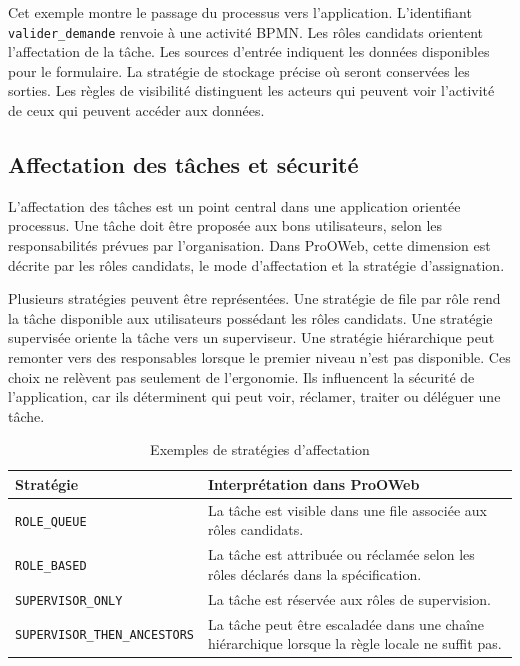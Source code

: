 Cet exemple montre le passage du processus vers l'application. L'identifiant \texttt{valider\_demande} renvoie à une activité BPMN. Les rôles candidats orientent l'affectation de la tâche. Les sources d'entrée indiquent les données disponibles pour le formulaire. La stratégie de stockage précise où seront conservées les sorties. Les règles de visibilité distinguent les acteurs qui peuvent voir l'activité de ceux qui peuvent accéder aux données.

\subsection{Affectation des tâches et sécurité}

L'affectation des tâches est un point central dans une application orientée processus. Une tâche doit être proposée aux bons utilisateurs, selon les responsabilités prévues par l'organisation. Dans ProOWeb, cette dimension est décrite par les rôles candidats, le mode d'affectation et la stratégie d'assignation.

Plusieurs stratégies peuvent être représentées. Une stratégie de file par rôle rend la tâche disponible aux utilisateurs possédant les rôles candidats. Une stratégie supervisée oriente la tâche vers un superviseur. Une stratégie hiérarchique peut remonter vers des responsables lorsque le premier niveau n'est pas disponible. Ces choix ne relèvent pas seulement de l'ergonomie. Ils influencent la sécurité de l'application, car ils déterminent qui peut voir, réclamer, traiter ou déléguer une tâche.

\begin{table}[H]
\centering
\small
\caption{Exemples de stratégies d'affectation}
\label{tab:chap3-strategies-affectation}
\begin{tabular}{p{4.2cm}p{9.0cm}}
\hline
\textbf{Stratégie} & \textbf{Interprétation dans ProOWeb} \\
\hline
\texttt{ROLE\_QUEUE} & La tâche est visible dans une file associée aux rôles candidats. \\
\texttt{ROLE\_BASED} & La tâche est attribuée ou réclamée selon les rôles déclarés dans la spécification. \\
\texttt{SUPERVISOR\_ONLY} & La tâche est réservée aux rôles de supervision. \\
\texttt{SUPERVISOR\_THEN\_ANCESTORS} & La tâche peut être escaladée dans une chaîne hiérarchique lorsque la règle locale ne suffit pas. \\
\hline
\end{tabular}
\end{table}

